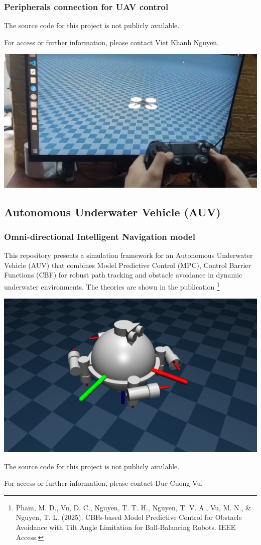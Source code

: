 \documentclass[9pt]{beamer}
\begin{document}
			\begin{frame}[fragile]
				\frametitle{Peripherals connection for UAV control}
				The source code for this project is not publicly available.
				
				For access or further information, please contact Viet Khanh Nguyen.
				\begin{center}
					\includegraphics[width=1\linewidth]{images/mjc-uav}
				\end{center}
			\end{frame}
		
		
		
		
		
		\subsection{Autonomous Underwater Vehicle (AUV)}
		
			\begin{frame}[fragile]
				\frametitle{Omni-directional Intelligent Navigation model}
				This repository presents a simulation framework for an Autonomous Underwater Vehicle (AUV) that combines Model Predictive Control (MPC), Control Barrier Functions (CBF) for robust path tracking and obstacle avoidance in dynamic underwater environments. The theories are shown in the publication \footnote{Pham, M. D., Vu, D. C., Nguyen, T. T. H., Nguyen, T. V. A., Vu, M. N., \& Nguyen, T. L. (2025). CBFs-based Model Predictive Control for Obstacle Avoidance with Tilt Angle Limitation for Ball-Balancing Robots. IEEE Access.}
				
				\begin{center}
					\includegraphics[width=0.5\linewidth]{images/mjc-odin}
				\end{center}
				The source code for this project is not publicly available.
				
				For access or further information, please contact Duc Cuong Vu.
			\end{frame}
		
\end{document}
